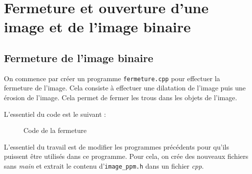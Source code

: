 \documentclass[french,a4paper,10pt]{article}
\begin{document}
	\newpage
	\section{Fermeture et ouverture d'une image et de l'image binaire}\label{sec:3}

	\subsection{Fermeture de l'image binaire}\label{subsec:3.1}

	On commence par créer un programme \texttt{fermeture.cpp} pour effectuer la fermeture de l'image.
	Cela consiste à effectuer une dilatation de l'image puis une érosion de l'image.
	Cela permet de fermer les trous dans les objets de l'image.

	L'essentiel du code est le suivant : %
	\begin{figure}[!htb]
		\centering
		\caption{Code de la fermeture}\label{Fig:fermeture-code}
	\end{figure}

	L'essentiel du travail est de modifier les programmes précédents pour qu'ils puissent être utilisés dans ce
	programme.
	Pour cela, on crée des nouveaux fichiers sans \emph{main} et extrait le contenu d'\texttt{image\_ppm.h} dans un
	fichier \emph{cpp}.
\end{document}

